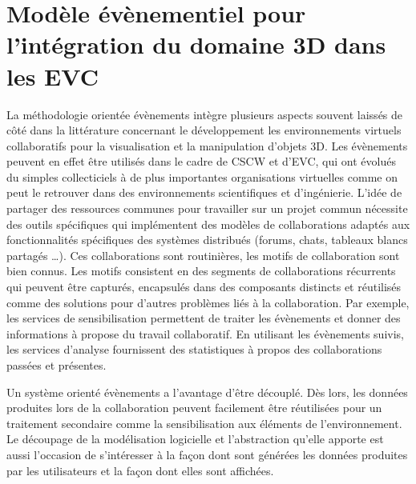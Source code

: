 
\section{Modèle évènementiel pour l'intégration du domaine 3D dans les 
EVC}

La méthodologie orientée évènements intègre plusieurs aspects souvent laissés 
de côté dans la littérature concernant le développement les environnements 
virtuels collaboratifs pour la visualisation et la manipulation d'objets 3D. 
Les évènements peuvent en effet être utilisés dans le cadre de \gls{CSCW} et 
d'\gls{EVC}, qui ont évolués du simples collecticiels à de plus importantes 
organisations virtuelles comme on peut le retrouver dans des environnements 
scientifiques et d'ingénierie. L'idée de partager des ressources communes pour 
travailler sur un projet commun nécessite des outils spécifiques qui implémentent 
des modèles de collaborations adaptés aux fonctionnalités spécifiques des 
systèmes distribués (forums, chats, tableaux blancs partagés \dots). Ces 
collaborations sont routinières, les motifs de collaboration sont bien connus. Les 
motifs consistent en des segments de collaborations récurrents qui peuvent être 
capturés, encapsulés dans des composants distincts et réutilisés comme des 
solutions pour d'autres problèmes liés à la collaboration. Par exemple, les services 
de sensibilisation permettent de traiter les évènements et donner des informations 
à propose du travail collaboratif. En utilisant les évènements suivis, les services 
d'analyse fournissent des statistiques à propos des collaborations passées et 
présentes.


Un système orienté évènements a l'avantage d'être découplé. Dès 
lors, les données produites lors de la collaboration peuvent facilement être 
réutilisées pour un traitement secondaire comme la sensibilisation aux éléments 
de l'environnement. 
Le découpage de la modélisation logicielle et l'abstraction qu'elle apporte est aussi 
l'occasion de s'intéresser à la façon dont sont générées les données produites par 
les utilisateurs et la façon dont elles sont affichées. 

